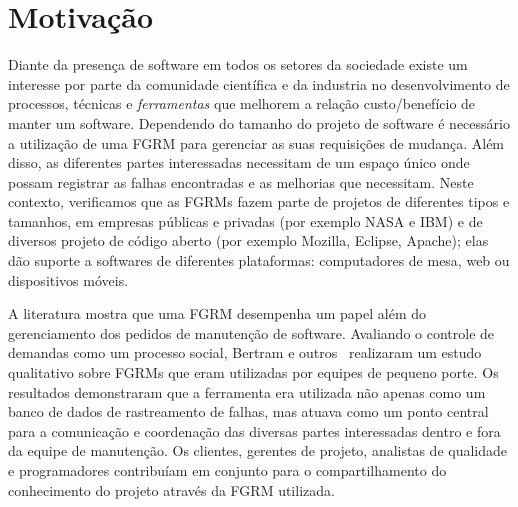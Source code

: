 \begin{table}[htpb]
\centering
{}
\caption{Exemplos de ferramentas e serviços da Internet que podem ser
    classificados como FGRMs. Extraído de~\cite{cavalcanti2014challenges}}\label{tab:exemplo}
\end{table}

\section{Motivação}\label{sec:intro-motivacao}

Diante da presença de software em todos os setores da sociedade existe um
interesse por parte da comunidade científica e da industria no desenvolvimento
de processos, técnicas e \textit{ferramentas} que melhorem a relação
custo/benefício de manter um software. Dependendo do tamanho do projeto de
software é necessário a utilização de uma FGRM para gerenciar as suas
requisições de mudança. Além disso, as diferentes partes interessadas
necessitam de um espaço único onde possam registrar as falhas encontradas e as
melhorias que necessitam. Neste contexto, verificamos que as FGRMs fazem parte
de projetos de diferentes tipos e tamanhos, em empresas públicas e privadas
(por exemplo NASA e IBM) e de diversos projeto de código aberto (por exemplo
Mozilla, Eclipse, Apache); elas dão suporte a softwares de diferentes
plataformas: computadores de mesa, web ou dispositivos móveis.

A literatura mostra que uma FGRM desempenha um papel além do gerenciamento dos
pedidos de manutenção de software. Avaliando o controle de demandas como um
processo social, Bertram e outros~\cite{Bertram:2010:CCB:1718918.1718972}
realizaram um estudo qualitativo sobre FGRMs que eram utilizadas por equipes de
pequeno porte. Os resultados demonstraram que a ferramenta era utilizada não
apenas como um banco de dados de rastreamento de falhas, mas atuava como um
ponto central para a comunicação e coordenação das diversas partes interessadas
dentro e fora da equipe de manutenção. Os clientes, gerentes de projeto,
analistas de qualidade e programadores contribuíam em conjunto para o
compartilhamento do conhecimento do projeto através da FGRM utilizada.

